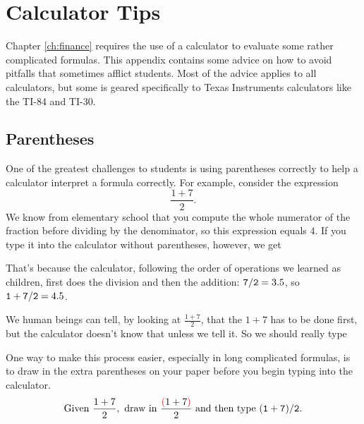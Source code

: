 \def\calckey#1{\fbox{\raisebox{0pt}[6pt][0pt]{\footnotesize\tt #1}}}

\def\calcscreen#1{%
\begin{center}%
  \fbox{%
    \begin{minipage}{2in}
      \tt
      #1
    \end{minipage}
  }
\end{center}%
}
\def\ca{\rule{0pt}{0pt}\hfill}

\def\caret{\char`\^}

\def\rightkey{\calckey{$\blacktriangleright$}}
\def\stokey{\calckey{STO$\blacktriangleright$}}

\def\tineg{\raisebox{1pt}[0pt][0pt]{-}}

\def\sto{\ensuremath{\rightarrow}}

\chapter{Calculator Tips}

Chapter \ref{ch:finance} requires the use of a calculator to evaluate some rather complicated formulas.
This appendix contains some advice on how to avoid pitfalls that sometimes afflict students.
Most of the advice applies to all calculators, but some is geared specifically to Texas Instruments calculators
like the TI-84 and TI-30.

\section{Parentheses}

One of the greatest challenges to students is using parentheses correctly to help a calculator interpret a formula correctly.
For example, consider the expression
\[\frac{1+7}{2}.\]
We know from elementary school that you compute the whole numerator of the fraction before dividing by the denominator,
so this expression equals $4$.
If you type it into the calculator without parentheses, however, we get
\calcscreen{1+7/2 \\
            \ca 4.5}
That's because the calculator, following the order of operations we learned as children,
first does the division and then the addition: ${\tt 7/2} = 3.5$, so ${\tt 1+7/2}=4.5$.

We human beings can tell, by looking at $\frac{1+7}{2}$, that the $1+7$ has to be done first,
but the calculator doesn't know that unless we tell it.  So we should really type
\calcscreen{(1+7)/2 \\
            \ca 4}
One way to make this process easier, especially in long complicated formulas, is to draw in the extra parentheses on your paper before you begin typing into the calculator.
\[\mbox{Given~}\frac{1+7}{2},\mbox{~draw in~}\frac{\textcolor{red}{(}1+7\textcolor{red}{)}}{2}\mbox{~and then type~}{\tt (1+7)/2}.\]

